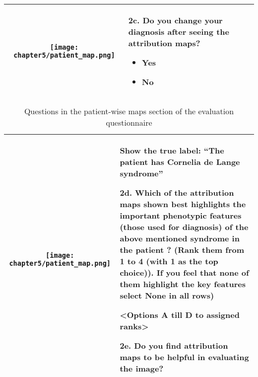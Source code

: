 \documentclass[../report.tex]{subfiles}
\begin{document}
\begin{table}[H]
\begin{tabular}{ | c | m{7cm} |}
   		\centering
   		\begin{minipage}{.49\textwidth}
   			\vspace*{1cm}
   			\centering
   			\texttt{[image: chapter5/patient\_map.png]}
   			
   			\vspace*{1cm}
   		\end{minipage}
   		
   		&
   		
   	   		
   		2c. Do you change your diagnosis after seeing the attribution maps?
   		\begin{itemize}
   			\item Yes
   			\item No
   		\end{itemize}
   		\\ \hline
   	\end{tabular}
   \end{table}
   	\pagebreak
   	
   	\begin{table}
   	
   \begin{tabular}{ | c | m{7cm} |}
   		\hline
	\begin{minipage}{.49\textwidth}
	\vspace*{1cm}
	\centering
	\texttt{[image: chapter5/patient\_map.png]}
	
	\vspace*{0.5cm}
\end{minipage}
   	
   	&
   	\vspace{.25cm}
   	Show the true label: \enquote{The patient has \textbf{Cornelia de Lange syndrome}}
   	
   	\vspace{.25cm}
   	
   	2d. Which of the attribution maps shown best highlights the important phenotypic
   	features (those used for diagnosis) of the above mentioned syndrome in the patient ?
   	(Rank them from 1 to 4 (with 1 as the top choice)). If you feel that none of them
   	highlight the key features select None in all rows)
   	
   	<Options A till D to assigned ranks>
   			
   	\vspace{.2cm}
   	2e. Do you find attribution maps to be helpful in evaluating the image?
   	\vspace{.5cm}
   	\\ \hline
   \end{tabular}
   	\caption{Questions in the patient-wise maps section of the evaluation questionnaire}\label{tbl_pat_wise}
   \end{table}
   
\end{document}
